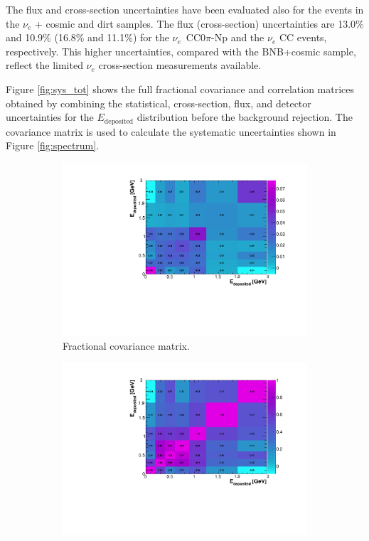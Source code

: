 The flux and cross-section uncertainties have been evaluated also for the events in the $\nu_e$ + cosmic and dirt samples. The flux (cross-section) uncertainties are 13.0\% and 10.9\% (16.8\% and 11.1\%) for the $\nu_e$~CC0$\pi$-Np and the $\nu_e$ CC events, respectively. This higher uncertainties, compared with the BNB+cosmic sample, reflect the limited $\nu_e$ cross-section measurements available. 

Figure \ref{fig:sys_tot} shows the full fractional covariance and correlation matrices obtained by combining the statistical, cross-section, flux, and detector uncertainties for the $E_{\mathrm{deposited}}$ distribution before the background rejection. The covariance matrix is used to calculate the systematic uncertainties shown in Figure \ref{fig:spectrum}. 

\begin{figure}[htbp]
  \begin{center}
    \begin{subfigure}{0.49\textwidth}
      \includegraphics[width=\linewidth]{figures/h_frac_tot.pdf}
      \caption{Fractional covariance matrix.}  \label{fig:frac_tot}
    \end{subfigure}\hfill
    \begin{subfigure}{0.49\textwidth}
      \includegraphics[width=\linewidth]{figures/h_corr_tot.pdf}

\end{subfigure}
\end{center}
\end{figure}
